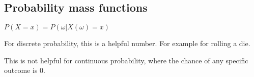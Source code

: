 
\subsection{Probability mass functions}

\(P(X=x)=P({\omega |X(\omega)=x})\)

For discrete probability, this is a helpful number. For example for rolling a die.

This is not helpful for continuous probability, where the chance of any specific outcome is \(0\).

